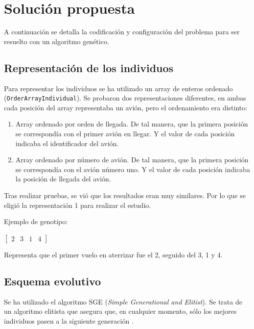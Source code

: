 \documentclass[a4paper,12pt,titlepage]{article}
\begin{document}
\section{Solución propuesta}

A continuación se detalla la codificación y configuración del problema para ser resuelto con un algoritmo genético.

\subsection{Representación de los individuos}

Para representar los individuos se ha utilizado un array de enteros ordenado (\lstinline|OrderArrayIndividual|). Se probaron dos representaciones diferentes, en ambas cada posición del array representaba un avión, pero el ordenamiento era distinto:

\begin{enumerate}[noitemsep]
	\item Array ordenado por orden de llegada. De tal manera, que la primera posición se correspondía con el primer avión en llegar. Y el valor de cada posición indicaba el identificador del avión.
	\item Array ordenado por número de avión. De tal manera, que la primera posición se correspondía con el avión número uno. Y el valor de cada posición indicaba la posición de llegada del avión.
\end{enumerate}

Tras realizar pruebas, se vió que los resultados eran muy similares. Por lo que se eligió la representación 1 para realizar el estudio.

Ejemplo de genotipo:

\begin{center}
$
\begin{bmatrix}
	2 & 3 & 1 & 4
\end{bmatrix}
$
\end{center}

Representa que el primer vuelo en aterrizar fue el 2, seguido del 3, 1 y 4.

\subsection{Esquema evolutivo}

Se ha utilizado el algoritmo SGE (\textit{Simple Generational and Elitist}). Se trata de un algoritmo elitista que asegura que, en cualquier momento, sólo los mejores individuos pasen a la siguiente generación \citep{jclec:sge}.
\end{document}
